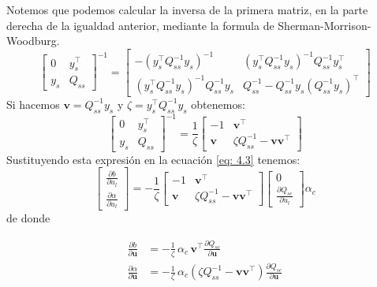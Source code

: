 \documentclass[letterpaper,12pt,oneside]{book}
\begin{document}
{{{{    Notemos que podemos calcular la inversa de la primera matriz, en la parte derecha de la igualdad anterior, mediante la formula de Sherman-Morrison-Woodburg. 
    \[
    \begin{bmatrix}
     0 & y_s^{\top} \\
        y_s & Q_{ss}
    \end{bmatrix}^{-1}
    =
    \begin{bmatrix}
        -( y_{s}^{\top}Q_{ss}^{-1}y_s)^{-1} & ( y_{s}^{\top}Q_{ss}^{-1}y_s)^{-1} Q_{ss}^{-1}y_s^{\top} \\
        ( y_{s}^{\top}Q_{ss}^{-1}y_s)^{-1} Q_{ss}^{-1}y_s & Q_{ss}^{-1} - Q_{ss}^{-1}y_s(Q_{ss}^{-1}y_s)^{\top}
    \end{bmatrix}
    \]
    Si hacemos $\mathbf{v}=Q_{ss}^{-1}y_s$ y $\zeta = y_{s}^{\top}Q_{ss}^{-1}y_s$ obtenemos: 
    \[
    \begin{bmatrix}
        0 & y_s^{\top} \\
        y_s & Q_{ss}
    \end{bmatrix}^{-1}
    =
    \frac{1}{\zeta}
    \begin{bmatrix}
        -1 & \mathbf{v}^{\top} \\
        \mathbf{v} & \zeta Q_{ss}^{-1} - \mathbf{v}\mathbf{v}^{\top}
    \end{bmatrix}
    \]
    Sustituyendo esta expresión en la ecuación \eqref{eq: 4.3} tenemos:
    \begin{equation*}
        \begin{bmatrix}
        \frac{\partial b}{\partial u_l} \\
        \frac{\partial \alpha}{\partial u_l}
        \end{bmatrix}
        =- \frac{1}{\zeta}
        \begin{bmatrix}
        -1 & \mathbf{v}^{\top} \\
        \mathbf{v} & \zeta Q_{ss}^{-1} - \mathbf{v}\mathbf{v}^{\top}
        \end{bmatrix}
        \begin{bmatrix}
        0 \\
       \frac{\partial Q_{sc}}{\partial u_l} 
        \end{bmatrix}\alpha_c 
    \end{equation*} 
    de donde 
     
\begin{align*}
\frac{\partial b}{\partial \mathbf{u}} &= -\frac{1}{\zeta}\,\alpha_c\,\mathbf{v}^\top \frac{\partial Q_{sc}}{\partial \mathbf{u}} \\[4pt]
\frac{\partial \alpha}{\partial \mathbf{u}} &= -\frac{1}{\zeta}\,\alpha_c\!\left( \zeta Q_{ss}^{-1} - \mathbf{v}\mathbf{v}^{\top}\right)\frac{\partial Q_{sc}}{\partial \mathbf{u}} 
\end{align*}

}}}}
\end{document}
